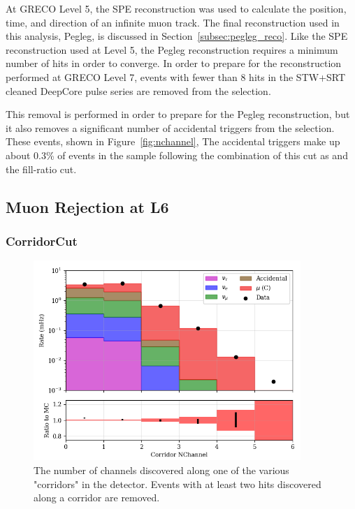 At GRECO Level 5, the SPE reconstruction was used to calculate the position, time, and direction of an infinite muon track.
The final reconstruction used in this analysis, Pegleg, is discussed in Section~\ref{subsec:pegleg_reco}.
Like the SPE reconstruction used at Level 5, the Pegleg reconstruction requires a minimum number of hits in order to converge.
In order to prepare for the reconstruction performed at GRECO Level 7, events with fewer than 8 hits in the STW+SRT cleaned DeepCore pulse series are removed from the selection.

This removal is performed in order to prepare for the Pegleg reconstruction, but it also removes a significant number of accidental triggers from the selection.
These events, shown in Figure~\ref{fig:nchannel}, 
The accidental triggers make up about 0.3\% of events in the sample following the combination of this cut as and the fill-ratio cut.



\subsection{Muon Rejection at L6}
\label{subsubsec:corridorcut}

\subsubsection{CorridorCut}
\begin{figure}[h]
	\centering
		\includegraphics[width=0.9\textwidth]{Corridor_Cut_nCh.png}
		\caption[CorridorCut Distribution]{The number of channels discovered along one of the various "corridors" in the detector. Events with at least two hits discovered along a corridor are removed.}
	\label{fig:corridorcut}
\end{figure}

